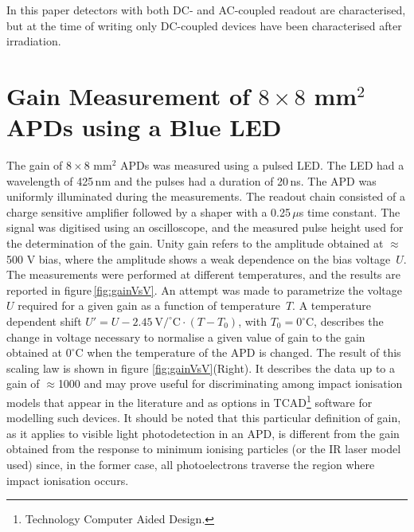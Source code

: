 \documentclass[review,number,sort&compress]{elsarticle}
\begin{document}
In this paper detectors with both DC- and AC-coupled readout are characterised, but at the time of writing only DC-coupled devices have been characterised after irradiation. 

\section{Gain Measurement of $8 \times 8$ mm$^2$ APDs using a Blue LED}
\label{sec:gain8x8led}

The gain of $8 \times 8$ mm$^2$ APDs was measured using a pulsed LED.
The LED had a wavelength of 425\,nm and the pulses had a duration of 20\,ns.
The APD was uniformly illuminated during the measurements.
The readout chain consisted of a charge sensitive amplifier followed by a shaper with a 0.25\,$\mu$s time constant.
The signal was digitised using an oscilloscope, and the measured pulse height used for the determination of the gain.
Unity gain refers to the amplitude obtained at $\approx$500 V bias, where the amplitude shows a weak dependence on the bias voltage~$U$.
The measurements were performed at different temperatures, and the results are reported in figure\,\ref{fig:gainVsV}.
An attempt was made to parametrize the  voltage~$U$ required for a given gain as a function of temperature~$T$.
A temperature dependent shift $U' = U -2.45~\textrm{V}/^\circ\textrm{C}\cdot (T - T_0)$, with $T_0 = 0^\circ\textrm{C}$, describes the change in voltage necessary to normalise a given value of gain to the gain obtained at $0^\circ\textrm{C}$ when the temperature of the APD is changed.
The result of this scaling law is shown in figure \ref{fig:gainVsV}(Right).
It describes the data up to a gain of $\approx$1000 and may prove useful for discriminating among impact ionisation models that appear in the literature and as options in TCAD\footnote{Technology Computer Aided Design.} software for modelling such devices.
It should be noted that this particular definition of gain, as it applies to visible light photodetection in an APD, is different from the gain obtained from the response to minimum ionising particles (or the IR laser model used) since, in the former case, all photoelectrons traverse the region where impact ionisation occurs.
\end{document}
